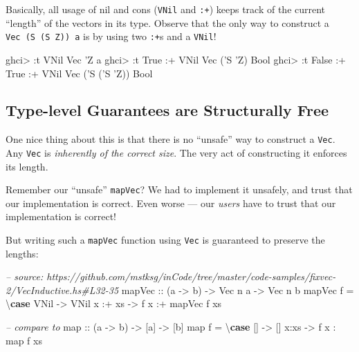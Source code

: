 \documentclass[]{article}
\newenvironment{Shaded}{}{}
\newcommand{\KeywordTok}[1]{\textcolor[rgb]{0.00,0.44,0.13}{\textbf{#1}}}
\newcommand{\DataTypeTok}[1]{\textcolor[rgb]{0.56,0.13,0.00}{#1}}
\newcommand{\CharTok}[1]{\textcolor[rgb]{0.25,0.44,0.63}{#1}}
\newcommand{\CommentTok}[1]{\textcolor[rgb]{0.38,0.63,0.69}{\textit{#1}}}
\newcommand{\OtherTok}[1]{\textcolor[rgb]{0.00,0.44,0.13}{#1}}
\newcommand{\FunctionTok}[1]{\textcolor[rgb]{0.02,0.16,0.49}{#1}}
\newcommand{\NormalTok}[1]{#1}
\begin{document}
Basically, all usage of nil and cons (\texttt{VNil} and \texttt{:+}) keeps track
of the current ``length'' of the vectors in its type. Observe that the only way
to construct a
\texttt{Vec\ (\textquotesingle{}S\ (\textquotesingle{}S\ \textquotesingle{}Z))\ a}
is by using two \texttt{:+}s and a \texttt{VNil}!

\begin{Shaded}
\begin{Highlighting}[]
\NormalTok{ghci}\FunctionTok{>} \FunctionTok{:}\NormalTok{t }\DataTypeTok{VNil}
\DataTypeTok{Vec} \CharTok{'Z a}
\NormalTok{ghci}\FunctionTok{>} \FunctionTok{:}\NormalTok{t }\DataTypeTok{True} \FunctionTok{:+} \DataTypeTok{VNil}
\DataTypeTok{Vec}\NormalTok{ (}\CharTok{'S '}\DataTypeTok{Z}\NormalTok{) }\DataTypeTok{Bool}
\NormalTok{ghci}\FunctionTok{>} \FunctionTok{:}\NormalTok{t }\DataTypeTok{False} \FunctionTok{:+} \DataTypeTok{True} \FunctionTok{:+} \DataTypeTok{VNil}
\DataTypeTok{Vec}\NormalTok{ (}\CharTok{'S ('}\DataTypeTok{S} \CharTok{'Z)) Bool}
\end{Highlighting}
\end{Shaded}

\subsection{Type-level Guarantees are Structurally
Free}\label{type-level-guarantees-are-structurally-free}

One nice thing about this is that there is no ``unsafe'' way to construct a
\texttt{Vec}. Any \texttt{Vec} is \emph{inherently of the correct size}. The
very act of constructing it enforces its length.

Remember our ``unsafe'' \texttt{mapVec}? We had to implement it unsafely, and
trust that our implementation is correct. Even worse --- our \emph{users} have
to trust that our implementation is correct!

But writing such a \texttt{mapVec} function using \texttt{Vec} is guaranteed to
preserve the lengths:

\begin{Shaded}
\begin{Highlighting}[]
\CommentTok{-- source: https://github.com/mstksg/inCode/tree/master/code-samples/fixvec-2/VecInductive.hs#L32-35}
\OtherTok{mapVec ::}\NormalTok{ (a }\OtherTok{->}\NormalTok{ b) }\OtherTok{->} \DataTypeTok{Vec}\NormalTok{ n a }\OtherTok{->} \DataTypeTok{Vec}\NormalTok{ n b}
\NormalTok{mapVec f }\FunctionTok{=}\NormalTok{ \textbackslash{}}\KeywordTok{case}
    \DataTypeTok{VNil}    \OtherTok{->} \DataTypeTok{VNil}
\NormalTok{    x }\FunctionTok{:+}\NormalTok{ xs }\OtherTok{->}\NormalTok{ f x }\FunctionTok{:+}\NormalTok{ mapVec f xs}

\CommentTok{-- compare to}
\NormalTok{map}\OtherTok{ ::}\NormalTok{ (a }\OtherTok{->}\NormalTok{ b) }\OtherTok{->}\NormalTok{ [a] }\OtherTok{->}\NormalTok{ [b]}
\NormalTok{map f }\FunctionTok{=}\NormalTok{ \textbackslash{}}\KeywordTok{case}
\NormalTok{    [] }\OtherTok{->}\NormalTok{ []}
\NormalTok{    x}\FunctionTok{:}\NormalTok{xs }\OtherTok{->}\NormalTok{ f x }\FunctionTok{:}\NormalTok{ map f xs}
\end{Highlighting}
\end{Shaded}
\end{document}
